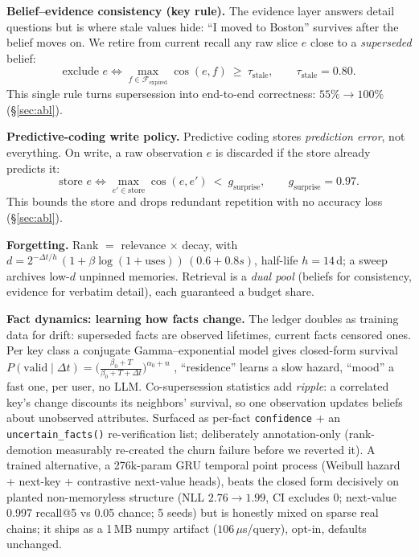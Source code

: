 \documentclass[11pt]{article}
\begin{document}
\textbf{Belief--evidence consistency (key rule).} The evidence layer answers detail
questions but is where stale values hide: ``I moved to Boston'' survives after the belief
moves on. We retire from current recall any raw slice $e$ close to a \emph{superseded} belief:
\[
\text{exclude } e \iff \max_{f\in\mathcal{F}_{\text{expired}}}\cos(e,f)\ \ge\ \tau_{\text{stale}},
\qquad \tau_{\text{stale}}=0.80.
\]
This single rule turns supersession into end-to-end correctness: $55\%\!\to\!100\%$
(\S\ref{sec:abl}).

\textbf{Predictive-coding write policy.} Predictive coding stores \emph{prediction error},
not everything. On write, a raw observation $e$ is discarded if the store already predicts it:
\[
\text{store } e \iff \max_{e'\in\text{store}}\cos(e,e')\ <\ g_{\text{surprise}},
\qquad g_{\text{surprise}}=0.97 .
\]
This bounds the store and drops redundant repetition with no accuracy loss (\S\ref{sec:abl}).

\textbf{Forgetting.} Rank $=$ relevance $\times$ decay, with
$d = 2^{-\Delta t/h}\,(1+\beta\log(1{+}\text{uses}))\,(0.6+0.8s)$, half-life $h=14$\,d; a
sweep archives low-$d$ unpinned memories. Retrieval is a \emph{dual pool} (beliefs for
consistency, evidence for verbatim detail), each guaranteed a budget share.

\textbf{Fact dynamics: learning how facts change.} The ledger doubles as training
data for drift: superseded facts are observed lifetimes, current facts censored ones.
Per key class a conjugate Gamma--exponential model gives closed-form survival
$P(\text{valid}\mid\Delta t)=\big(\tfrac{\beta_0+T}{\beta_0+T+\Delta t}\big)^{\alpha_0+n}$
, ``residence'' learns a slow hazard, ``mood'' a fast one, per user, no LLM.
Co-supersession statistics add \emph{ripple}: a correlated key's change discounts its
neighbors' survival, so one observation updates beliefs about unobserved attributes.
Surfaced as per-fact \texttt{confidence} + an \texttt{uncertain\_facts()}
re-verification list; deliberately annotation-only (rank-demotion measurably
re-created the churn failure before we reverted it). A trained alternative, a
276k-param GRU temporal point process (Weibull hazard + next-key + contrastive
next-value heads), beats the closed form decisively on planted non-memoryless
structure (NLL $2.76\!\to\!1.99$, CI excludes 0; next-value 0.997 recall@5 vs 0.05
chance; 5 seeds) but is honestly mixed on sparse real chains; it ships as a 1\,MB
numpy artifact ($106\,\mu$s/query), opt-in, defaults unchanged.
\end{document}
